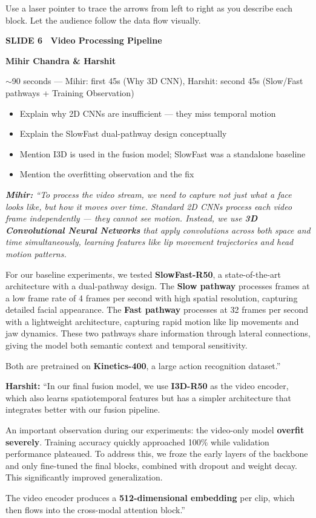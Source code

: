 \documentclass[11pt, a4paper]{article}
\newcommand{\slideheading}[3]{%
  \vspace{0.6cm}
  \begin{tcolorbox}[slidebox]
    \textbf{\color{NavyBlue}SLIDE #1 \textemdash\ #2}\\[2pt]
    \begin{tcolorbox}[presenterbox, title=Presenter(s)]
      \color{AccBlue}\bfseries #3
    \end{tcolorbox}
  \end{tcolorbox}
}
\newcommand{\timing}[1]{%
  \begin{tcolorbox}[timebox, title=Suggested Time]
    \color{AccOrange} #1
  \end{tcolorbox}
}
\newcommand{\keypoints}[1]{%
  \begin{tcolorbox}[keybox, title=Key Points to Cover]
    #1
  \end{tcolorbox}
}
\newcommand{\script}[1]{%
  \begin{mdframed}[
    backgroundcolor=white,
    linecolor=MidText!40,
    linewidth=0.5pt,
    leftmargin=0pt,
    rightmargin=0pt,
    innerleftmargin=10pt,
    innerrightmargin=8pt,
    innertopmargin=8pt,
    innerbottommargin=8pt,
    roundcorner=3pt
  ]
  \itshape\color{MidText}
  #1
  \end{mdframed}
}
\newcommand{\tip}[1]{%
  \begin{tcolorbox}[tipbox, title=Presenter Tip]
    #1
  \end{tcolorbox}
}
\begin{document}
\tip{Use a laser pointer to trace the arrows from left to right as you describe each block. Let the audience follow the data flow visually.}

\slideheading{6}{Video Processing Pipeline}{Mihir Chandra \& Harshit}

\timing{$\sim$90 seconds --- Mihir: first 45s (Why 3D CNN), Harshit: second 45s (Slow/Fast pathways + Training Observation)}

\keypoints{%
\begin{itemize}[leftmargin=*, itemsep=2pt]
  \item Explain why 2D CNNs are insufficient --- they miss temporal motion
  \item Explain the SlowFast dual-pathway design conceptually
  \item Mention I3D is used in the fusion model; SlowFast was a standalone baseline
  \item Mention the overfitting observation and the fix
\end{itemize}
}

\script{%
\textbf{Mihir:} ``To process the video stream, we need to capture not just what a face \textit{looks like}, but how it \textit{moves} over time. Standard 2D CNNs process each video frame independently --- they cannot see motion. Instead, we use \textbf{3D Convolutional Neural Networks} that apply convolutions across both space and time simultaneously, learning features like lip movement trajectories and head motion patterns.

For our baseline experiments, we tested \textbf{SlowFast-R50}, a state-of-the-art architecture with a dual-pathway design. The \textbf{Slow pathway} processes frames at a low frame rate of 4 frames per second with high spatial resolution, capturing detailed facial appearance. The \textbf{Fast pathway} processes at 32 frames per second with a lightweight architecture, capturing rapid motion like lip movements and jaw dynamics. These two pathways share information through lateral connections, giving the model both semantic context and temporal sensitivity.

Both are pretrained on \textbf{Kinetics-400}, a large action recognition dataset.''

\textbf{Harshit:} ``In our final fusion model, we use \textbf{I3D-R50} as the video encoder, which also learns spatiotemporal features but has a simpler architecture that integrates better with our fusion pipeline.

An important observation during our experiments: the video-only model \textbf{overfit severely}. Training accuracy quickly approached 100\% while validation performance plateaued. To address this, we froze the early layers of the backbone and only fine-tuned the final blocks, combined with dropout and weight decay. This significantly improved generalization.

The video encoder produces a \textbf{512-dimensional embedding} per clip, which then flows into the cross-modal attention block.''
}
\end{document}
